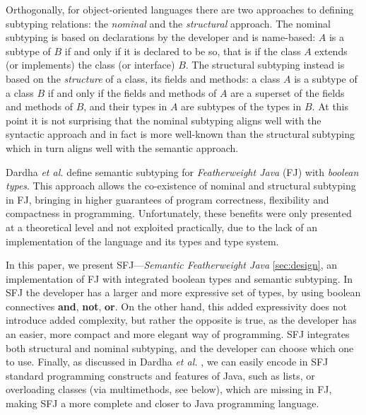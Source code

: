 \documentclass[runningheads]{llncs}
\begin{document}
Orthogonally, for object-oriented languages there are two approaches to defining subtyping relations: the \emph{nominal} and the \emph{structural} approach.
The nominal subtyping is based on {declarations} by the developer and is {name}-based: $A$ is a subtype of $B$ if and only if it is declared to be so, that is if the class $A$ extends (or implements) the class (or interface) $B$.
The structural subtyping instead is based on the \emph{structure} of a class, its fields and methods: a class $A$ is a subtype of a class $B$ if and only if the fields and methods of $A$ are a superset of the fields and methods of $B$, and their types in $A$ are subtypes of the types in $B$.
At this point it is not surprising that the nominal subtyping aligns well with the syntactic approach and in fact is more well-known than the structural subtyping which in turn aligns well with the semantic approach.

Dardha \emph{et al.} \cite{Dardha2013,Dardha2017} define semantic subtyping for \emph{Featherweight Java} (FJ) \cite{featherweight} with \emph{boolean types}.
This approach allows the co-existence of nominal and structural subtyping in FJ, bringing in higher guarantees of program correctness, flexibility and compactness in programming.
Unfortunately, these benefits were only presented at a theoretical level and not exploited practically, due to the lack of an implementation of the language and its types and type system.

In this paper, we present SFJ---\emph{Semantic Featherweight Java} \autoref{sec:design}, an implementation of FJ with integrated boolean types and semantic subtyping.
In SFJ the developer has a larger and more expressive set of types, by using boolean connectives \textbf{and}, \textbf{not}, \textbf{or}. On the other hand, this added expressivity does not introduce added complexity, but rather the opposite is true, as the developer has an easier, more compact and more elegant way of programming.
SFJ integrates both structural and nominal subtyping, and the developer can choose which one to use.
Finally, as discussed in Dardha \emph{et al.} \cite[\S 8.4]{Dardha2017}, we can easily encode in SFJ standard programming constructs and features of Java, such as lists, or overloading classes (via multimethods, see below), which are missing in FJ, making SFJ a more complete and closer to Java programming language.
\end{document}
